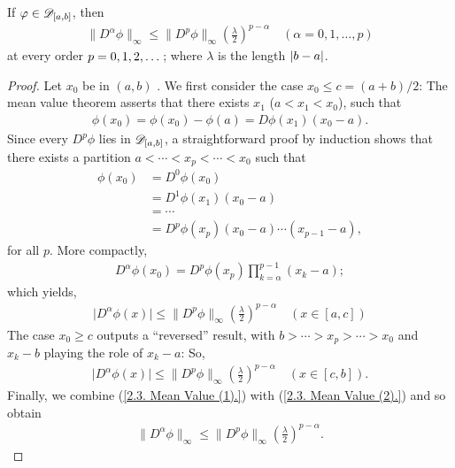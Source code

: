 If 
%
  $\varphi\in{\mathscr D}_{[a, b]}$, then %
%
%
  \begin{align}\label{2.3. Mean value inequality.}
    \| D^\alpha \phi \|_\infty 
      \leq 
    \| D^{p} \phi \|_\infty \left(\frac{\lambda}{2}\right)^{p-\alpha}
      \quad (\alpha = 0, 1, \dots, p) 
  \end{align}
%
at every order $p=0, 1, 2, \dots$; %
where $\lambda$ is the length $\left\lvert b-a \right\rvert$. %
%
\begin{proof}
Let $x_0$ be in %
% 
    $(a, b)$ .
% 
We first consider the case $x_0 \leq c = (a+b)/2$: %
The mean value theorem asserts that there exists %
%
  $x_{1}$ ($a <x_{1} < x_{0} $), 
%
such that 
%
  \begin{align}
    \phi(x_0) =\phi(x_0) - \phi(a)=  D\phi(x_{1})(x_{0} -a).
  \end{align}
%
Since every %
%
  $D^p\phi$ lies in ${\mathscr D}_{[a, b]}$, %
%
a straightforward proof by induction shows that there exists a partition %
%
  $a < \cdots < x_p < \cdots < x_0 $ 
%
such that 
  \begin{align}
    \phi(x_0) & = D^0 \phi(x_0) \\ 
              & = D^1\phi(x_{1})(x_{0} - a ) \\
              & = \cdots \nonumber\\
              & = D^p\phi(x_{p})(x_{0} - a)\cdots(x_{p-1}-a),
  \end{align}
%
for all $p$. %
More compactly, 
%
  \begin{align}
      D^\alpha \phi (x_0) = D^p\phi(x_p) \prod_{k= \alpha}^{p-1}(x_k - a);
  \end{align}
%
which yields, 
%
  \begin{align}\label{2.3. Mean Value (1).}
    \lvert D^\alpha \phi(x) \rvert
      \leq 
    \| D^{p} \phi \|_\infty 
    \left(\frac{\lambda}{2}\right)^{p-\alpha}
    \quad (x \in [a, c])
  \end{align}
%
The case $x_0 \geq c$ outputs a ``reversed'' result, with %
%
  $b > \cdots > x_p > \cdots > x_0$ %
%
and $x_k -b$ playing the role of $x_k-a$: %
So, %
%
  \begin{align}\label{2.3. Mean Value (2).}
    \lvert D^\alpha \phi(x) \rvert
      \leq 
    \| D^{p} \phi \|_\infty 
    \left(\frac{\lambda}{2}\right)^{p-\alpha} 
    \quad (x \in [c, b]).
  \end{align}
%
Finally, we combine %
%
  (\ref{2.3. Mean Value (1).}) with %
  (\ref{2.3. Mean Value (2).}) %
%
and so obtain %
%
  \begin{align}
    \| D^\alpha \phi \|_\infty 
      \leq 
    \| D^{p} \phi \|_\infty 
    \left(\frac{\lambda}{2}\right)^{p-\alpha}.
  \end{align}
%
\end{proof}